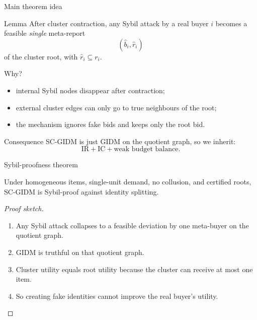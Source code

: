 \documentclass[aspectratio=169]{beamer}
\begin{document}
\begin{frame}{Main theorem idea}
\small
\begin{block}{Lemma}
After cluster contraction, any Sybil attack by a real buyer \(i\) becomes a feasible \emph{single} meta-report
\[
(\widehat b_i,\widehat r_i)
\]
of the cluster root, with \(\widehat r_i \subseteq r_i\).
\end{block}

\begin{block}{Why?}
\begin{itemize}
    \item internal Sybil nodes disappear after contraction;
    \item external cluster edges can only go to true neighbours of the root;
    \item the mechanism ignores fake bids and keeps only the root bid.
\end{itemize}
\end{block}

\begin{block}{Consequence}
SC-GIDM is just GIDM on the quotient graph, so we inherit:
\[
\text{IR} + \text{IC} + \text{weak budget balance}.
\]
\end{block}
\end{frame}

\begin{frame}{Sybil-proofness theorem}
\small
\begin{theorem}
Under homogeneous items, single-unit demand, no collusion, and certified roots, SC-GIDM is Sybil-proof against identity splitting.
\end{theorem}

\begin{proof}[Proof sketch]
\begin{enumerate}
    \item Any Sybil attack collapses to a feasible deviation by one meta-buyer on the quotient graph.
    \item GIDM is truthful on that quotient graph.
    \item Cluster utility equals root utility because the cluster can receive at most one item.
    \item So creating fake identities cannot improve the real buyer's utility.
\end{enumerate}
\end{proof}

\end{frame}
\end{document}
